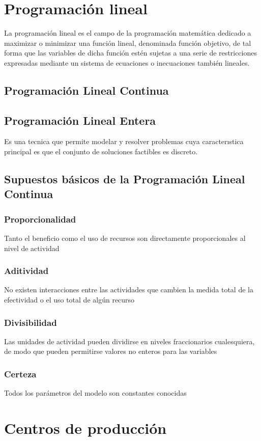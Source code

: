 \documentclass[12pt]{book}
\begin{document}
\section{Programación lineal}La programación lineal es el campo de la programación matemática dedicado a maximizar o minimizar una función lineal, denominada función objetivo, de tal forma que las variables de dicha función estén sujetas a una serie de restricciones expresadas mediante un sistema de ecuaciones o inecuaciones también lineales.
\subsection{Programación Lineal Continua}
\subsection{Programación Lineal Entera}Es una tecnica que permite modelar y resolver problemas cuya caracterıstica principal
es que el conjunto de soluciones factibles es discreto.
\subsection{Supuestos básicos de la Programación Lineal Continua}
\subsubsection{Proporcionalidad}
Tanto el beneficio como el uso de recursos son directamente proporcionales al nivel de
actividad
\subsubsection{Aditividad}No existen interacciones entre las actividades que cambien la medida total de la
efectividad o el uso total de algún recurso
\subsubsection{Divisibilidad}Las unidades de actividad pueden dividirse en niveles fraccionarios cualesquiera, de
modo que pueden permitirse valores no enteros para las variables
\subsubsection{Certeza}Todos los parámetros del modelo son constantes conocidas

\section{Centros de producción}
\end{document}
